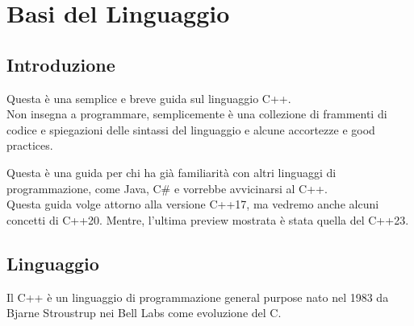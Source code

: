 
\chapter{Basi del Linguaggio}





\section{Introduzione}

\enlargethispage{1\linewidth}

\textsf{\small Questa è una semplice e breve guida sul linguaggio C++. }\\

\textsf{\small Non insegna a programmare,
semplicemente è una collezione di frammenti di codice e spiegazioni delle sintassi
del linguaggio e alcune accortezze e good practices.}

\textsf{\small Questa è una guida per chi ha già familiarità con altri linguaggi di programmazione, come Java, C\# e vorrebbe avvicinarsi al C++.}\\

\textsf{\small Questa guida volge attorno alla versione C++17, ma vedremo anche alcuni concetti di C++20.
Mentre, l'ultima preview mostrata è stata quella del C++23.}\\


\section{Linguaggio}

\textsf{\small Il C++ è un linguaggio di programmazione general purpose nato nel 1983 da Bjarne Stroustrup nei Bell Labs come evoluzione del C.}\\

